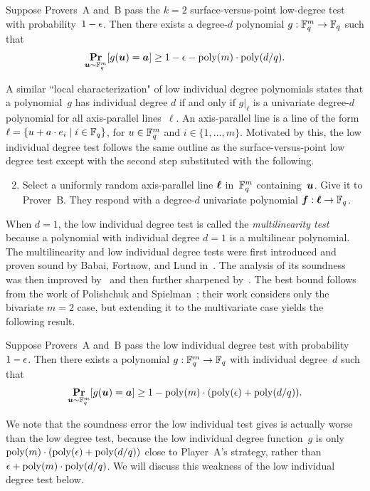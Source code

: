 \begin{theorem}\label{thm:raz-safra}
Suppose Provers~$\mathrm{A}$ and~$\mathrm{B}$ pass the $k = 2$ surface-versus-point low-degree test with probability~$1-\epsilon$.
Then there exists a degree-$d$ polynomial $g:\mathbb F_q^m \rightarrow \mathbb F_q$ such that
\begin{equation*}
\mathop{\bf Pr\/}_{\boldsymbol{u} \sim \mathbb F_q^m}[g(\boldsymbol{u}) = \boldsymbol{a}] \geq 1 - \epsilon - \mathrm{poly}(m) \cdot \mathrm{poly}(d/q).
\end{equation*}
\end{theorem}

A similar ``local characterization" of low individual degree polynomials states that a polynomial~$g$ has individual degree $d$
if and only if $g|_{\ell}$ is a univariate degree-$d$ polynomial for all axis-parallel lines~$\ell$.
An axis-parallel line is a line of the form $\ell = \{u + a \cdot e_i \mid i \in \mathbb F_q\}$, for $u \in \mathbb F_q^m$ and $i \in \{1, \ldots, m\}$.
Motivated by this, the low individual degree test follows the same outline as the surface-versus-point low degree test
except with the second step substituted with the following.
\begin{enumerate}
\setcounter{enumi}{1}
\item Select a uniformly random axis-parallel line $\boldsymbol{\ell}$ in~$\mathbb F_q^m$ containing~$\boldsymbol{u}$.
	Give it to Prover~$\mathrm{B}$. They respond with a degree-$d$ univariate polynomial $\boldsymbol{f}:\boldsymbol{\ell}\rightarrow \mathbb F_q$.
\end{enumerate}
When $d = 1$, the low individual degree test
is called the \emph{multilinearity test} because a polynomial with individual degree $d = 1$ is a multilinear polynomial.
The multilinearity  and low individual degree tests were
first introduced and proven sound by Babai, Fortnow, and Lund in~\cite{BFL91}.
The analysis of its soundness was then improved by~\cite{AS98} and then further sharpened by~\cite{FHS94}.
The best bound follows from the work of Polishchuk and Spielman~\cite{PS94};
their work considers only the bivariate $m = 2$ case,
but extending it to the multivariate case yields the following result.
\begin{theorem}\label{thm:classical-test-soundness}
Suppose Provers~$\mathrm{A}$ and~$\mathrm{B}$ pass the low individual degree test with probability~$1-\epsilon$.
Then there exists a polynomial $g:\mathbb F_q^m \rightarrow \mathbb F_q$ with individual degree~$d$ such that
\begin{equation*}
\mathop{\bf Pr\/}_{\boldsymbol{u} \sim \mathbb F_q^m}[g(\boldsymbol{u}) = \boldsymbol{a}] \geq 1 -  \mathrm{poly}(m) \cdot (\mathrm{poly}(\epsilon) + \mathrm{poly}(d/q)).
\end{equation*}
\end{theorem}
We note that the soundness error the low individual test gives is actually worse than the low degree test,
because the low individual degree function~$g$ is only $\mathrm{poly}(m) \cdot (\mathrm{poly}(\epsilon) + \mathrm{poly}(d/q))$ close to Player~$\mathrm{A}$'s strategy,
rather than $\epsilon + \mathrm{poly}(m) \cdot \mathrm{poly}(d/q)$.
We will discuss this weakness of the low individual degree test below.


